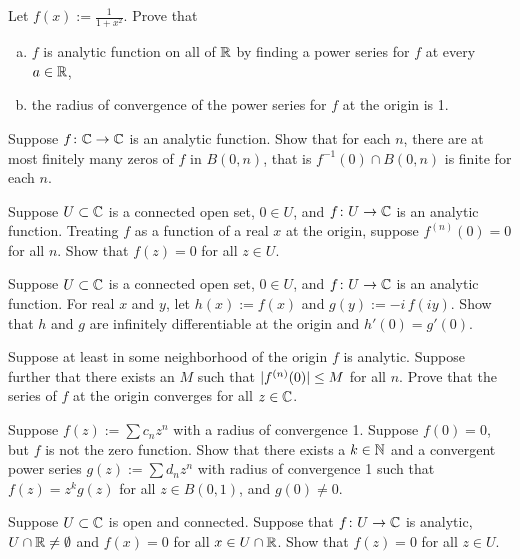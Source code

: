 \begin{exercise}
Let $f(x) := \frac{1}{1+x^2}$.  Prove that
\begin{enumerate}[a)]
\item
$f$ is analytic function on all of ${\mathbb{R}}$
by finding a power series for $f$ at every $a \in {\mathbb{R}}$,
\item
the radius of convergence of
the power series for $f$ at the origin is 1.
\end{enumerate}
\end{exercise}


\begin{exercise}
Suppose $f \colon {\mathbb{C}} \to {\mathbb{C}}$ is an analytic function.  Show that for each
$n$, there are at most finitely many zeros of $f$ in $B(0,n)$, that is
$f^{-1}(0) \cap B(0,n)$ is finite for each $n$.
\end{exercise}

\begin{exercise}
Suppose $U \subset {\mathbb{C}}$ is a connected open set, $0 \in U$, and $f \colon U
\to {\mathbb{C}}$ is an analytic function.  Treating $f$ as a function of a real $x$
at the origin, suppose $f^{(n)}(0) = 0$ for all $n$.  Show that $f(z) = 0$
for all $z \in U$.
\end{exercise}

\begin{exercise}
Suppose $U \subset {\mathbb{C}}$ is a connected open set, $0 \in U$, and $f \colon U
\to {\mathbb{C}}$ is an analytic function.  For real $x$ and $y$,
let $h(x) := f(x)$ and $g(y) := -i \, f(iy)$.
Show that $h$ and $g$ are infinitely differentiable at the origin and
$h'(0) = g'(0)$.
\end{exercise}

\begin{exercise}
Suppose at least in some neighborhood of the origin
$f$ is analytic.  Suppose further that there exists an $M$
such that $\lvert {f^{(n)}(0)} \rvert \leq M$ for all $n$.
Prove that the series of $f$ at the origin converges for all $z \in {\mathbb{C}}$.
\end{exercise}

\begin{exercise}
Suppose $f(z) := \sum c_n z^n$ with a radius of convergence 1.  Suppose $f(0)
= 0$, but $f$ is not the zero function.
Show that there exists a $k \in {\mathbb{N}}$ and a convergent
power series $g(z) := \sum d_n z^n$ with radius of convergence 1
such that $f(z) = z^k g(z)$ for all $z \in B(0,1)$, and $g(0) \not= 0$.
\end{exercise}

\begin{exercise}
Suppose $U \subset {\mathbb{C}}$ is open and connected.  Suppose that
$f \colon U \to {\mathbb{C}}$ is analytic, $U \cap {\mathbb{R}} \not= \emptyset$ and
$f(x) = 0$ for all $x \in U \cap {\mathbb{R}}$.  Show that $f(z) = 0$ for all $z \in
U$.
\end{exercise}

